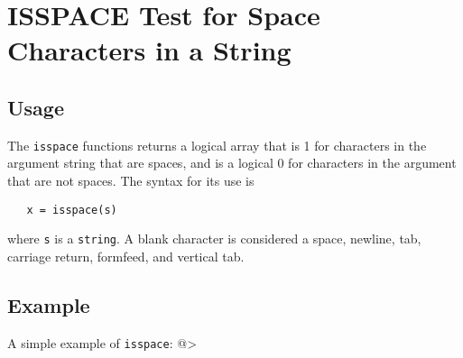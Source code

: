 \section{ISSPACE Test for Space Characters in a String}

\subsection{Usage}

The \verb|isspace| functions returns a logical array that is 1 
for characters in the argument string that are spaces, and 
is a logical 0 for characters in the argument that are not
spaces.  The syntax for its use is
\begin{verbatim}
   x = isspace(s)
\end{verbatim}
where \verb|s| is a \verb|string|.  A blank character is considered
a space, newline, tab, carriage return, formfeed, and vertical
tab.
\subsection{Example}

A simple example of \verb|isspace|:
@>
